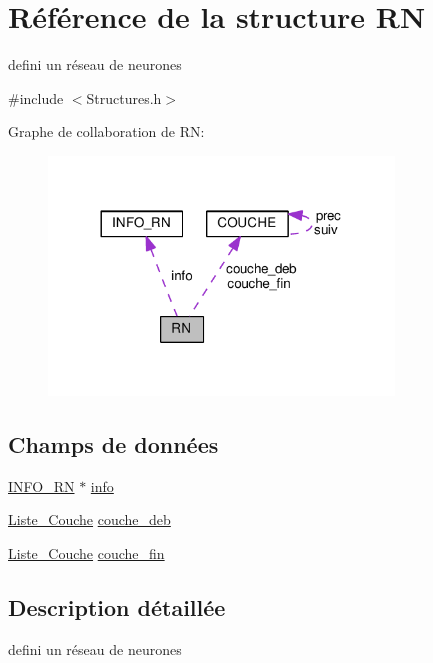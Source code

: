 \hypertarget{structRN}{}\section{Référence de la structure RN}
\label{structRN}


defini un réseau de neurones  




{\ttfamily \#include $<$Structures.\+h$>$}



Graphe de collaboration de RN\+:\nopagebreak
\begin{figure}[H]
\begin{center}
\leavevmode
\includegraphics[width=260pt]{structRN__coll__graph}
\end{center}
\end{figure}
\subsection*{Champs de données}
\begin{DoxyCompactItemize}
\item 
\hyperlink{structINFO__RN}{I\+N\+F\+O\+\_\+\+RN} $\ast$ \hyperlink{structRN_a6e638d06aa8ad842d9b7e866f8a0e749}{info}
\item 
\hyperlink{structCOUCHE}{Liste\+\_\+\+Couche} \hyperlink{structRN_a7819ca58c5af68054e17881d5189edb2}{couche\+\_\+deb}
\item 
\hyperlink{structCOUCHE}{Liste\+\_\+\+Couche} \hyperlink{structRN_a587292a48a2d40ee63c00b1e0162e9e2}{couche\+\_\+fin}
\end{DoxyCompactItemize}


\subsection{Description détaillée}
defini un réseau de neurones 

